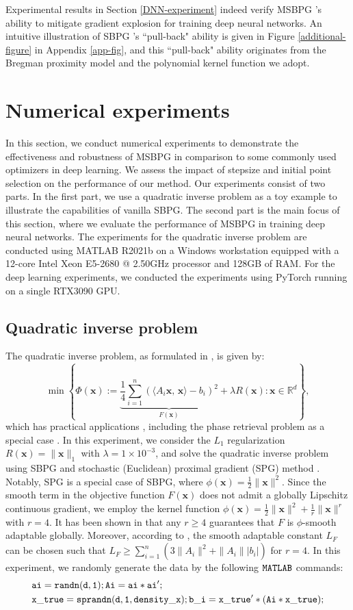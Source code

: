\documentclass[twoside,11pt]{article}
\newcommand{\R}{\mathbb R}
\def\inprod#1#2{\langle#1,\,#2\rangle}
\def\vx{{\bm{x}}}
\begin{document}
Experimental results in Section \ref{DNN-experiment} indeed verify MSBPG 's ability to mitigate gradient explosion for training deep neural networks. An intuitive illustration of SBPG 's ``pull-back" ability is given in Figure \ref{additional-figure} in Appendix \ref{app-fig}, and this ``pull-back" ability originates from the Bregman proximity model and the polynomial kernel function we adopt.


\section{Numerical experiments}\label{section-experiments}
In this section, we conduct numerical experiments to demonstrate the effectiveness and robustness of  MSBPG in comparison to some commonly used optimizers in deep learning. We assess the impact of stepsize and initial point selection on the performance of our method. Our experiments consist of two parts. In the first part, we use a quadratic inverse problem as a toy example to illustrate the capabilities of vanilla SBPG. The second part is the main focus of this section, where we evaluate the performance of MSBPG in training deep neural networks. The experiments for the quadratic inverse problem are conducted using MATLAB R2021b on a Windows workstation equipped with a 12-core Intel Xeon E5-2680 @ 2.50GHz processor and 128GB of RAM. For the deep learning experiments, we conducted the experiments using PyTorch running on a single RTX3090 GPU.

\subsection{Quadratic inverse problem}
The quadratic inverse problem, as formulated in \citep{bolte2018first}, is given by:
\[
\min\left\{\Phi(\vx):=\underbrace{\frac{1}{4}\sum_{i=1}^n(\inprod{A_i\vx}{\vx}-b_i)^2}_{F(\vx)}+\lambda R(\vx): \vx\in\R^d\right\},
\]
which has practical applications \citep{beck2013sparsity}, including the phase retrieval problem as a special case \citep{luke2017phase}. In this experiment, we consider the $L_1$ regularization $R(\vx)=\|\vx\|_1$ with $\lambda=1\times10^{-3}$, and solve the quadratic inverse problem using SBPG and stochastic {(Euclidean)} proximal gradient (SPG) method \citep{bertsekas2011incremental}. Notably, SPG is a special case of SBPG, where $\phi(\vx)=\frac{1}{2}\|\vx\|^2$. Since the smooth term in the objective function $F(\vx)$ does not admit a globally Lipschitz continuous gradient, we employ the kernel function $\phi(\vx)=\frac{1}{2}\|\vx\|^2+\frac{1}{r}\|\vx\|^r$ with $r=4$. It has been shown in \citep{lu2018relatively} that any $r\geq4$ guarantees that $F$ is $\phi$-smooth adaptable globally. Moreover, according to \citep{bolte2018first}, the smooth adaptable constant $L_F$ can be chosen such that $L_F\geq\sum_{i=1}^n(3\|A_i\|^2+\|A_i\||b_i|)$ for $r=4$. In this experiment, we randomly generate the data by the following ${\tt MATLAB}$ commands: 
\[
\begin{aligned}
&{\tt ai = randn(d,1);Ai = ai*ai';}\\
&{\tt x\_true = sprandn(d,1,density\_x); b\_i = x\_true'*(Ai*x\_true);}
\end{aligned}
\]
\end{document}
